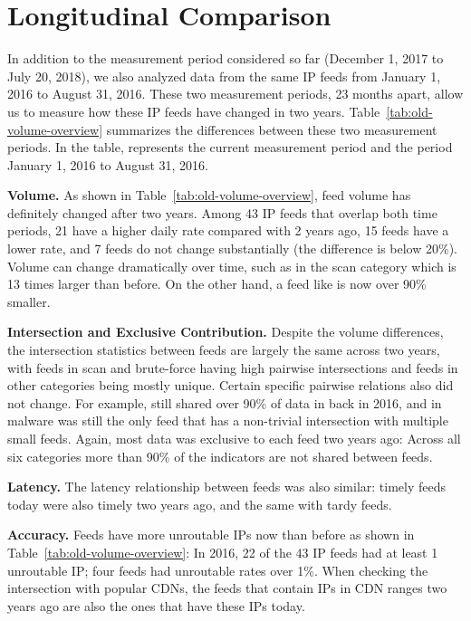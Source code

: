 \section{Longitudinal Comparison}
\label{sec:new_vs_old}

In addition to the measurement period considered so far (December 1, 2017 to July 20, 2018), we also analyzed data from the same IP feeds from January 1, 2016 to August 31, 2016. These two measurement periods, 23 months apart, allow us to measure how these IP feeds have changed in two years. Table~\ref{tab:old-volume-overview} summarizes the differences between these two measurement periods. In the table,  represents the current measurement period and  the period  January 1, 2016 to August 31, 2016.


\noindent\textbf{Volume.}
As shown in Table~\ref{tab:old-volume-overview}, feed volume has definitely changed after two years. Among 43 IP feeds that overlap both time periods,
21 have a higher daily rate compared with 2 years ago, 15 feeds
have a lower rate, and 7 feeds do not change substantially (the difference is below 20\%).
Volume can change dramatically over time, such as {\feedTSAlienVault}
in the scan category which is 13 times larger than before. On the other hand, a feed like {\feedTSBots} is now over 90\% smaller.

\noindent\textbf{Intersection and Exclusive Contribution.}
Despite the volume differences, the intersection statistics between feeds are largely the same across two years,
with feeds in scan and brute-force having high pairwise intersections and
feeds in other categories being mostly unique. Certain specific pairwise relations also did not change.
For example, {\feedbadipssh} still shared over 90\% of data in {\feeddangerrule} back in 2016, and {\feedetiprep} in malware
was still the only feed that has a non-trivial intersection with multiple small feeds.
Again, most data was exclusive to each feed two years ago: Across all
six categories more than 90\% of the indicators are not shared between feeds.

\noindent\textbf{Latency.}
The latency relationship between feeds was also similar:
timely feeds today were also timely two years ago, and the same with tardy feeds.

\noindent\textbf{Accuracy.}
Feeds have more unroutable IPs now than before as shown in Table~\ref{tab:old-volume-overview}:
In 2016, 22 of the 43 IP feeds had at least 1 unroutable IP; four feeds had unroutable rates over 1\%.
When checking the intersection with popular CDNs,
the feeds that contain IPs in CDN ranges two years ago are also the ones that have these IPs today.

